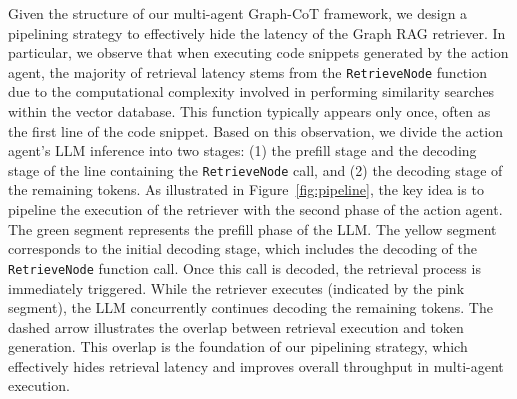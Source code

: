 

Given the structure of our multi-agent Graph-CoT framework, we design a pipelining strategy to effectively hide the latency of the Graph RAG retriever. In particular, we observe that when executing code snippets generated by the action agent, the majority of retrieval latency stems from the \texttt{RetrieveNode} function due to the computational complexity involved in performing similarity searches within the vector database. This function typically appears only once, often as the first line of the code snippet. Based on this observation, we divide the action agent’s LLM inference into two stages: (1) the prefill stage and the decoding stage of the line containing the \texttt{RetrieveNode} call, and (2) the decoding stage of the remaining tokens. As illustrated in Figure~\ref{fig:pipeline}, the key idea is to pipeline the execution of the retriever with the second phase of the action agent. The green segment represents the prefill phase of the LLM. The yellow segment corresponds to the initial decoding stage, which includes the decoding of the \texttt{RetrieveNode} function call. Once this call is decoded, the retrieval process is immediately triggered. While the retriever executes (indicated by the pink segment), the LLM concurrently continues decoding the remaining tokens. The dashed arrow illustrates the overlap between retrieval execution and token generation. This overlap is the foundation of our pipelining strategy, which effectively hides retrieval latency and improves overall throughput in multi-agent execution.

